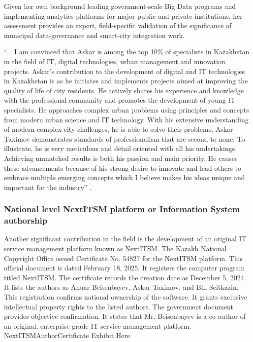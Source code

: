Given her own background leading government-scale Big Data programs and implementing analytics platforms for major public and private institutions, her assessment provides an expert, field-specific validation of the significance of \mrls municipal data-governance and smart-city integration work.
\begin{fullquote}
``... I am convinced that Askar is among the top 10\% of specialists in Kazakhstan in the field of IT, digital technologies, urban management and innovation projects. Askar's contribution to the development of digital and IT technologies in Kazakhstan is as he initiates and implements projects aimed at improving the quality of life of city residents. He actively shares his experience and knowledge with the professional community and promotes the development of young IT specialists. He approaches complex urban problems using principles and concepts from modern urban science and IT technology. With his extensive understanding of modern complex city challenges, he is able to solve their problems. Askar Taximov demonstrates standards of professionalism that are second to none. To illustrate, he is very meticulous and detail oriented with all his undertakings. Achieving unmatched results is both his passion and main priority. He causes these advancements because of his strong desire to innovate and lead others to embrace multiple emerging concepts which I believe makes his ideas unique and important for the industry''  . 
\end{fullquote} 


\subsubsection{National level NextITSM platform or Information System authorship}
\label{subsubsec:Authorship}
Another significant contribution in the field is the development of an original IT service management platform known as NextITSM. The Kazakh National Copyright Office issued Certificate No. 54827 for the NextITSM platform. This official document is dated February 18, 2025. It registers the computer program titled NextITSM. The certificate records the creation date as December 5, 2024. It lists the authors as Anuar Beisenbayev, Askar Taximov, and Bill Seitkazin. This registration confirms national ownership of the software. It grants exclusive intellectual property rights to the listed authors. The government document provides objective confirmation. It states that Mr. Beisenbayev is a co author of an original, enterprise grade IT service management platform. {NextITSMAuthorCertificate Exhibit Here}

